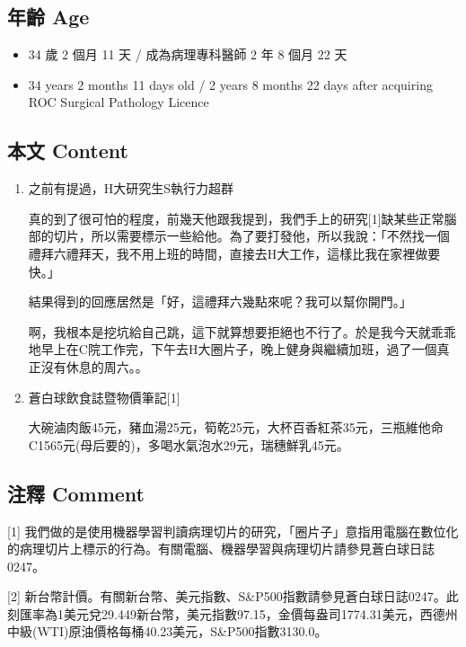\documentclass[a5paper, 11pt
]{book}
\providecommand{\tightlist}{%
  \setlength{\itemsep}{0pt}\setlength{\parskip}{0pt}}
\begin{document}
\hypertarget{ux5e74ux9f61-age-29}{%
\subsection{年齡 Age}\label{ux5e74ux9f61-age-29}}

\begin{itemize}
\tightlist
\item
  34 歲 2 個月 11 天 / 成為病理專科醫師 2 年 8 個月 22 天
\item
  34 years 2 months 11 days old / 2 years 8 months 22 days after
  acquiring ROC Surgical Pathology Licence
\end{itemize}

\hypertarget{ux672cux6587-content-29}{%
\subsection{本文 Content}\label{ux672cux6587-content-29}}

\begin{enumerate}
\def\labelenumi{\arabic{enumi}.}
\item
  之前有提過，H大研究生S執行力超群

  真的到了很可怕的程度，前幾天他跟我提到，我們手上的研究{[}1{]}缺某些正常腦部的切片，所以需要標示一些給他。為了要打發他，所以我說：「不然找一個禮拜六禮拜天，我不用上班的時間，直接去H大工作，這樣比我在家裡做要快。」

  結果得到的回應居然是「好，這禮拜六幾點來呢？我可以幫你開門。」

  啊，我根本是挖坑給自己跳，這下就算想要拒絕也不行了。於是我今天就乖乖地早上在C院工作完，下午去H大圈片子，晚上健身與繼續加班，過了一個真正沒有休息的周六。。
\item
  蒼白球飲食誌暨物價筆記{[}1{]}

  大碗滷肉飯45元，豬血湯25元，筍乾25元，大杯百香紅茶35元，三瓶維他命C1565元(母后要的)，多喝水氣泡水29元，瑞穗鮮乳45元。
\end{enumerate}

\hypertarget{ux6ce8ux91cb-comment-29}{%
\subsection{注釋 Comment}\label{ux6ce8ux91cb-comment-29}}

{[}1{]}
我們做的是使用機器學習判讀病理切片的研究，「圈片子」意指用電腦在數位化的病理切片上標示的行為。有關電腦、機器學習與病理切片請參見蒼白球日誌0247。

{[}2{]}
新台幣計價。有關新台幣、美元指數、S\&P500指數請參見蒼白球日誌0247。此刻匯率為1美元兌29.449新台幣，美元指數97.15，金價每盎司1774.31美元，西德州中級(WTI)原油價格每桶40.23美元，S\&P500指數3130.0。
\end{document}
